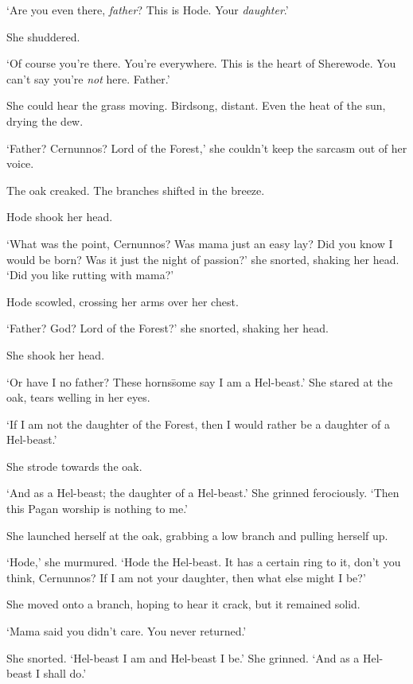 ‘Are you even there, \textit{father}? This is Hode. Your
\textit{daughter}.’

She shuddered.

‘Of course you’re there. You’re everywhere. This is the heart of
Sherewode. You can’t say you’re \textit{not} here. Father.’

She could hear the grass moving. Birdsong, distant. Even the heat of
the sun, drying the dew.

‘Father? Cernunnos? Lord of the Forest,’ she couldn’t keep the sarcasm
out of her voice.

The oak creaked. The branches shifted in the breeze.

Hode shook her head.

‘What was the point, Cernunnos? Was mama just an easy lay? Did you
know I would be born? Was it just the night of passion?’ she snorted,
shaking her head. ‘Did you like rutting with mama?’

Hode scowled, crossing her arms over her chest.

‘Father? God? Lord of the Forest?’ she snorted, shaking her head.

She shook her head.

‘Or have I no father? These horns\=some say I am a Hel-beast.’ She
stared at the oak, tears welling in her eyes.

‘If I am not the daughter of the Forest, then I would rather be a
daughter of a Hel-beast.’

She strode towards the oak.

‘And as a Hel-beast; the daughter of a Hel-beast.’ She grinned
ferociously. ‘Then this Pagan worship is nothing to me.’

She launched herself at the oak, grabbing a low branch and pulling
herself up.

‘Hode,’ she murmured. ‘Hode the Hel-beast. It has a certain ring to
it, don’t you think, Cernunnos? If I am not your daughter, then what
else might I be?’

She moved onto a branch, hoping to hear it crack, but it remained
solid.

‘Mama said you didn’t care. You never returned.’

She snorted. ‘Hel-beast I am and Hel-beast I be.’ She grinned. ‘And as
a Hel-beast I shall do.’

